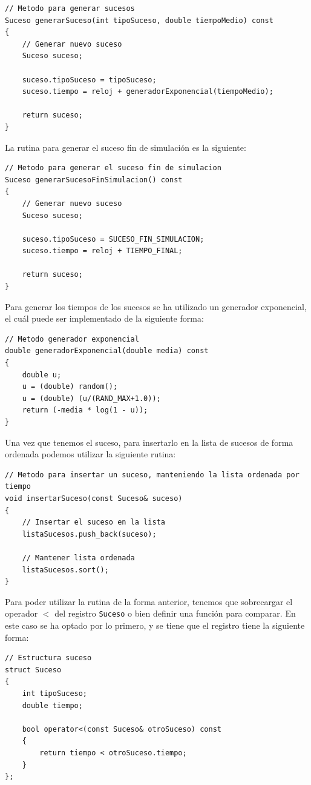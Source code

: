 \documentclass[11pt,a4paper]{article}
\begin{document}
\begin{lstlisting}
// Metodo para generar sucesos
Suceso generarSuceso(int tipoSuceso, double tiempoMedio) const
{
	// Generar nuevo suceso
    Suceso suceso;

    suceso.tipoSuceso = tipoSuceso;
    suceso.tiempo = reloj + generadorExponencial(tiempoMedio);
    
    return suceso;
}
\end{lstlisting}

La rutina para generar el suceso fin de simulación es la siguiente:

\begin{lstlisting}
// Metodo para generar el suceso fin de simulacion
Suceso generarSucesoFinSimulacion() const
{
	// Generar nuevo suceso
    Suceso suceso;

    suceso.tipoSuceso = SUCESO_FIN_SIMULACION;
    suceso.tiempo = reloj + TIEMPO_FINAL;

    return suceso;
}
\end{lstlisting}

Para generar los tiempos de los sucesos se ha utilizado un generador exponencial, el cuál
puede ser implementado de la siguiente forma:

\begin{lstlisting}
// Metodo generador exponencial
double generadorExponencial(double media) const
{
	double u;
    u = (double) random();
    u = (double) (u/(RAND_MAX+1.0));
    return (-media * log(1 - u));
}
\end{lstlisting}

Una vez que tenemos el suceso, para insertarlo en la lista de sucesos de forma ordenada podemos
utilizar la siguiente rutina:

\begin{lstlisting}
// Metodo para insertar un suceso, manteniendo la lista ordenada por tiempo
void insertarSuceso(const Suceso& suceso)
{
	// Insertar el suceso en la lista
    listaSucesos.push_back(suceso);

    // Mantener lista ordenada
    listaSucesos.sort();
}
\end{lstlisting}

Para poder utilizar la rutina de la forma anterior, tenemos que sobrecargar el operador
$<$ del registro \texttt{Suceso} o bien definir una función para comparar. En este caso
se ha optado por lo primero, y se tiene que el registro tiene la siguiente forma:

\begin{lstlisting}
// Estructura suceso
struct Suceso
{
	int tipoSuceso;
    double tiempo;

    bool operator<(const Suceso& otroSuceso) const
    {
    	return tiempo < otroSuceso.tiempo;
	}
};
\end{lstlisting}
\end{document}
